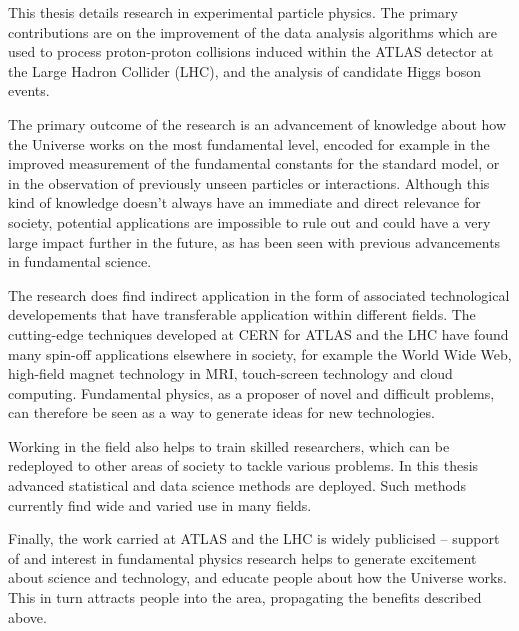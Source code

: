 
This thesis details research in experimental particle physics.
The primary contributions are on the improvement of the data analysis algorithms which are used to process proton-proton collisions induced within the ATLAS detector at the Large Hadron Collider (LHC), and the analysis of candidate Higgs boson events.

The primary outcome of the research is an advancement of knowledge about how the Universe works on the most fundamental level, encoded for example in the improved measurement of the fundamental constants for the standard model, or in the observation of previously unseen particles or interactions.
Although this kind of knowledge doesn't always have an immediate and direct relevance for society, potential applications are impossible to rule out and could have a very large impact further in the future, as has been seen with previous advancements in fundamental science.

The research does find indirect application in the form of associated technological developements that have transferable application within different fields.
The cutting-edge techniques developed at CERN for ATLAS and the LHC have found many spin-off applications elsewhere in society, for example the World Wide Web, high-field magnet technology in MRI, touch-screen technology and cloud computing.
Fundamental physics, as a proposer of novel and difficult problems, can therefore be seen as a way to generate ideas for new technologies.

Working in the field also helps to train skilled researchers, which can be redeployed to other areas of society to tackle various problems.
In this thesis advanced statistical and data science methods are deployed.
Such methods currently find wide and varied use in many fields.

Finally, the work carried at ATLAS and the LHC is widely publicised -- support of and interest in fundamental physics research helps to generate excitement about science and technology, and educate people about how the Universe works.
This in turn attracts people into the area, propagating the benefits described above.
